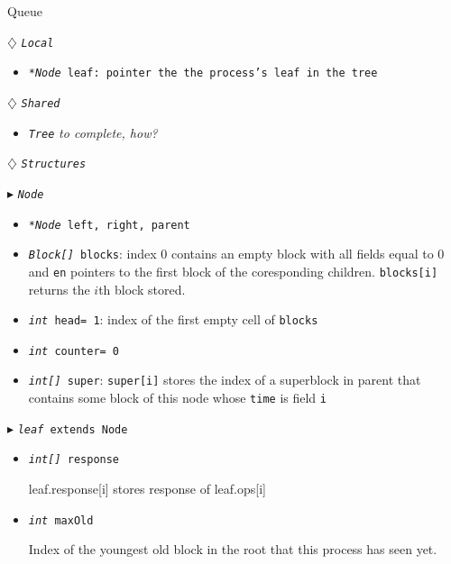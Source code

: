 \documentclass[10pt]{article}
\theoremstyle{definition}
\begin{document}
\begin{algorithm}
\caption{Queue \label{algQ}}
\begin{algorithmic}[1]
\begin{multicols}{2}


\Statex $\diamondsuit$ \texttt{\textsl{Local}}
\begin{itemize}
\item \texttt{\textsl{*Node} leaf\textsf{: pointer the the process's leaf in the tree}}
\end{itemize}

\Statex

\Statex $\diamondsuit$ \texttt{\textsl{Shared}}
\begin{itemize}
\item \texttt{\textsl{Tree}} \textit{to complete, how?}
\end{itemize}

\Statex
\Statex $\diamondsuit$ \texttt{\textsl{Structures}}

\Statex $\blacktriangleright$ \texttt{\textsl{Node}}
\begin{itemize}
\item \texttt{\textsl{*Node} left, right, parent}
\item \texttt{\textsl{Block[]} blocks}\textsf{: index 0 contains an empty block with all fields equal to 0 and \texttt{en} pointers to the first block of the coresponding children. \texttt{blocks[i]} returns the $i$th block stored.}
\item \texttt{\textsl{int} head= 1}\textsf{: index of the first empty cell of \texttt{blocks}}
\item \texttt{\textsl{int} counter= 0}\textsf{}
\item \texttt{\textsl{int[]} super}\textsf{: \texttt{super[i]} stores the index of a superblock in parent that contains some block of this node whose \texttt{time} is field \texttt{i}}
\end{itemize}

\Statex $\blacktriangleright$ \texttt{\textsl{leaf} extends Node}
\begin{itemize}
  \item \texttt{\textsl{int[]} response}
  
  \textsf{leaf.response[i] stores response of leaf.ops[i]}
  
  \item \texttt{\textsl{int} maxOld}

  \textsf{Index of the youngest old block in the root that this process has seen yet.}
  

\end{itemize}
\end{multicols}
\end{algorithmic}
\end{algorithm}
\end{document}
